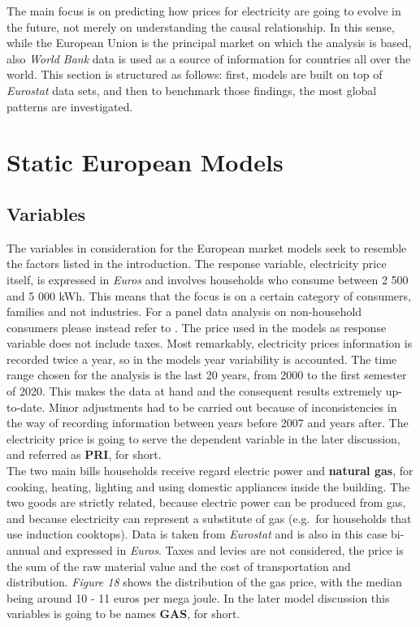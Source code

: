 \documentclass{book}
\begin{document}
\noindent The main focus is on predicting how prices for electricity are going to evolve in the future, not merely on understanding the causal relationship. In this sense, while the European Union is the principal market on which the analysis is based, also \textit{World Bank} data is used as a source of information for countries all over the world. This section is structured as follows: first, models are built on top of \textit{Eurostat} data sets, and then to benchmark those findings, the most global patterns are investigated.

\section{Static European Models}
\subsection{Variables}

The variables in consideration for the European market models seek to resemble the factors listed in the introduction. The response variable, electricity price itself, is expressed in \textit{Euros} and involves households who consume between 2 500 and 5 000 kWh. This means that the focus is on a certain category of consumers, families and not industries. For a panel data analysis on non-household consumers please instead refer to \cite{del2019industrial}.  The price used in the models as response variable does not include taxes. Most remarkably, electricity prices information is recorded twice a year, so in the models year variability is accounted. The time range chosen for the analysis is the last 20 years, from 2000 to the first semester of 2020. This makes the data at hand and the consequent results extremely up-to-date. Minor adjustments had to be carried out because of inconsistencies in the way of recording information between years before 2007 and years after. The electricity price is going to serve the dependent variable in the later discussion, and referred as \textbf{PRI}, for short.\\

\noindent The two main bills households receive regard electric power and \textbf{natural gas}, for cooking, heating, lighting and using domestic appliances inside the building. The two goods are strictly related, because electric power can be produced from gas, and because electricity can represent a substitute of gas (e.g.\ for households that use induction cooktops). Data is taken from \textit{Eurostat} and is also in this case bi-annual and expressed in \textit{Euros}. Taxes and levies are not considered, the price is the sum of the raw material value and the cost of transportation and distribution. \textit{Figure 18} shows the distribution of the gas price, with the median being around 10 - 11 euros per mega joule. In the later model discussion this variables is going to be names \textbf{GAS}, for short.
\end{document}

